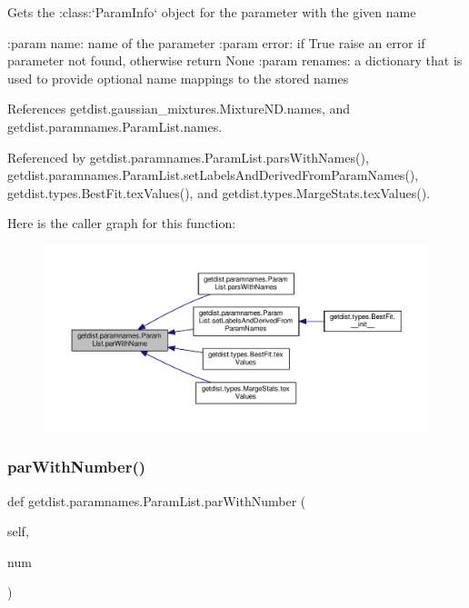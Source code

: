 \begin{DoxyVerb}Gets the :class:`ParamInfo` object for the parameter with the given name

:param name: name of the parameter
:param error: if True raise an error if parameter not found, otherwise return None
:param renames: a dictionary that is used to provide optional name mappings to the stored names
\end{DoxyVerb}
 

References getdist.\+gaussian\+\_\+mixtures.\+Mixture\+N\+D.\+names, and getdist.\+paramnames.\+Param\+List.\+names.



Referenced by getdist.\+paramnames.\+Param\+List.\+pars\+With\+Names(), getdist.\+paramnames.\+Param\+List.\+set\+Labels\+And\+Derived\+From\+Param\+Names(), getdist.\+types.\+Best\+Fit.\+tex\+Values(), and getdist.\+types.\+Marge\+Stats.\+tex\+Values().

Here is the caller graph for this function\+:
\nopagebreak
\begin{figure}[H]
\begin{center}
\leavevmode
\includegraphics[width=350pt]{classgetdist_1_1paramnames_1_1ParamList_a700a5bd1076df5b7a3fd00a102325175_icgraph}
\end{center}
\end{figure}
\mbox{\label{classgetdist_1_1paramnames_1_1ParamList_ade3843133bf3fbe5fbbbf074e1a62890}} 
\subsubsection{\texorpdfstring{par\+With\+Number()}{parWithNumber()}}
{\footnotesize\ttfamily def getdist.\+paramnames.\+Param\+List.\+par\+With\+Number (\begin{DoxyParamCaption}\item[{}]{self,  }\item[{}]{num }\end{DoxyParamCaption})}




